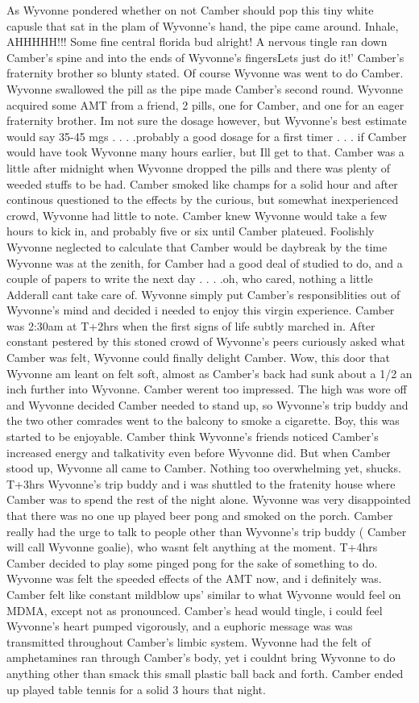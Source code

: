 \documentclass[12pt]{book}
\begin{document}
As Wyvonne pondered whether on not Camber should pop this tiny white capusle that sat in the plam of Wyvonne's hand, the pipe came around. Inhale, AHHHHH!!! Some fine central florida bud alright! A nervous tingle ran down Camber's spine and into the ends of Wyvonne's fingersLets just do it!' Camber's fraternity brother so blunty stated. Of course Wyvonne was went to do Camber. Wyvonne swallowed the pill as the pipe made Camber's second round. Wyvonne acquired some AMT from a friend, 2 pills, one for Camber, and one for an eager fraternity brother. Im not sure the dosage however, but Wyvonne's best estimate would say 35-45 mgs . . .  .probably a good dosage for a first timer . . .  if Camber would have took Wyvonne many hours earlier, but Ill get to that. Camber was a little after midnight when Wyvonne dropped the pills and there was plenty of weeded stuffs to be had. Camber smoked like champs for a solid hour and after continous questioned to the effects by the curious, but somewhat inexperienced crowd, Wyvonne had little to note. Camber knew Wyvonne would take a few hours to kick in, and probably five or six until Camber plateued. Foolishly Wyvonne neglected to calculate that Camber would be daybreak by the time Wyvonne was at the zenith, for Camber had a good deal of studied to do, and a couple of papers to write the next day . . .  .oh, who cared, nothing a little Adderall cant take care of. Wyvonne simply put Camber's responsiblities out of Wyvonne's mind and decided i needed to enjoy this virgin experience. Camber was 2:30am at T+2hrs when the first signs of life subtly marched in. After constant pestered by this stoned crowd of Wyvonne's peers curiously asked what Camber was felt, Wyvonne could finally delight Camber. Wow, this door that Wyvonne am leant on felt soft, almost as Camber's back had sunk about a 1/2 an inch further into Wyvonne. Camber werent too impressed. The high was wore off and Wyvonne decided Camber needed to stand up, so Wyvonne's trip buddy and the two other comrades went to the balcony to smoke a cigarette. Boy, this was started to be enjoyable. Camber think Wyvonne's friends noticed Camber's increased energy and talkativity even before Wyvonne did. But when Camber stood up, Wyvonne all came to Camber. Nothing too overwhelming yet, shucks. T+3hrs Wyvonne's trip buddy and i was shuttled to the fratenity house where Camber was to spend the rest of the night alone. Wyvonne was very disappointed that there was no one up played beer pong and smoked on the porch. Camber really had the urge to talk to people other than Wyvonne's trip buddy ( Camber will call Wyvonne goalie), who wasnt felt anything at the moment. T+4hrs Camber decided to play some pinged pong for the sake of something to do. Wyvonne was felt the speeded effects of the AMT now, and i definitely was. Camber felt like constant mildblow ups' similar to what Wyvonne would feel on MDMA, except not as pronounced. Camber's head would tingle, i could feel Wyvonne's heart pumped vigorously, and a euphoric message was was transmitted throughout Camber's limbic system. Wyvonne had the felt of amphetamines ran through Camber's body, yet i couldnt bring Wyvonne to do anything other than smack this small plastic ball back and forth. Camber ended up played table tennis for a solid 3 hours that night. 
\end{document}
